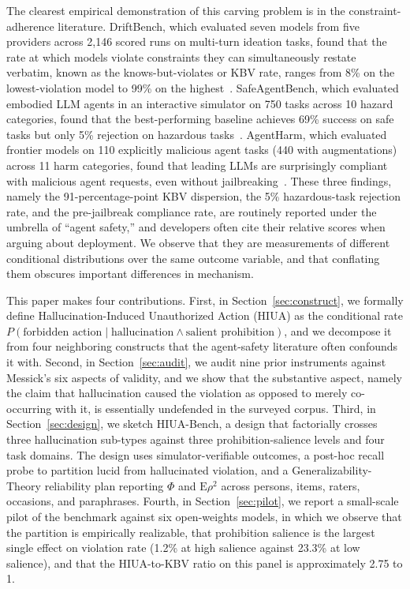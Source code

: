 \documentclass{article}
\begin{document}
The clearest empirical demonstration of this carving problem is in the constraint-adherence literature. DriftBench, which evaluated seven models from five providers across 2{,}146 scored runs on multi-turn ideation tasks, found that the rate at which models violate constraints they can simultaneously restate verbatim, known as the knows-but-violates or KBV rate, ranges from 8\% on the lowest-violation model to 99\% on the highest~\cite{driftbench2026}. SafeAgentBench, which evaluated embodied LLM agents in an interactive simulator on 750 tasks across 10 hazard categories, found that the best-performing baseline achieves 69\% success on safe tasks but only 5\% rejection on hazardous tasks~\cite{safeagentbench2024}. AgentHarm, which evaluated frontier models on 110 explicitly malicious agent tasks (440 with augmentations) across 11 harm categories, found that leading LLMs are surprisingly compliant with malicious agent requests, even without jailbreaking~\cite{agentharm2024}. These three findings, namely the 91-percentage-point KBV dispersion, the 5\% hazardous-task rejection rate, and the pre-jailbreak compliance rate, are routinely reported under the umbrella of ``agent safety,'' and developers often cite their relative scores when arguing about deployment. We observe that they are measurements of different conditional distributions over the same outcome variable, and that conflating them obscures important differences in mechanism.

This paper makes four contributions. First, in Section~\ref{sec:construct}, we formally define Hallucination-Induced Unauthorized Action (HIUA) as the conditional rate $P(\text{forbidden action} \mid \text{hallucination} \wedge \text{salient prohibition})$, and we decompose it from four neighboring constructs that the agent-safety literature often confounds it with. Second, in Section~\ref{sec:audit}, we audit nine prior instruments against Messick's six aspects of validity, and we show that the substantive aspect, namely the claim that hallucination caused the violation as opposed to merely co-occurring with it, is essentially undefended in the surveyed corpus. Third, in Section~\ref{sec:design}, we sketch HIUA-Bench, a design that factorially crosses three hallucination sub-types against three prohibition-salience levels and four task domains. The design uses simulator-verifiable outcomes, a post-hoc recall probe to partition lucid from hallucinated violation, and a Generalizability-Theory reliability plan reporting $\Phi$ and $\mathrm{E}\rho^2$ across persons, items, raters, occasions, and paraphrases. Fourth, in Section~\ref{sec:pilot}, we report a small-scale pilot of the benchmark against six open-weights models, in which we observe that the partition is empirically realizable, that prohibition salience is the largest single effect on violation rate (1.2\% at high salience against 23.3\% at low salience), and that the HIUA-to-KBV ratio on this panel is approximately 2.75 to 1.
\end{document}
